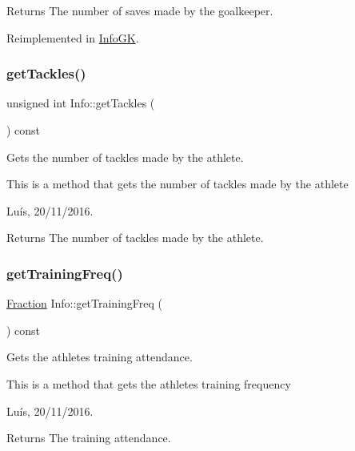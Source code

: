 \begin{DoxyReturn}{Returns}
The number of saves made by the goalkeeper. 
\end{DoxyReturn}


Reimplemented in \hyperlink{class_info_g_k_a5690b8056b8f30b5127f99b46ef9a5d9}{Info\+GK}.

\hypertarget{class_info_abab4dbd4bf56022685e1984fffb00c60}{}\label{class_info_abab4dbd4bf56022685e1984fffb00c60} 
\subsubsection{\texorpdfstring{get\+Tackles()}{getTackles()}}
{\footnotesize\ttfamily unsigned int Info\+::get\+Tackles (\begin{DoxyParamCaption}{ }\end{DoxyParamCaption}) const}



Gets the number of tackles made by the athlete. 

This is a method that gets the number of tackles made by the athlete

Luís, 20/11/2016. 

\begin{DoxyReturn}{Returns}
The number of tackles made by the athlete. 
\end{DoxyReturn}
\hypertarget{class_info_ace20d53ed24c8288e7e2fab3d4c4faa1}{}\label{class_info_ace20d53ed24c8288e7e2fab3d4c4faa1} 
\subsubsection{\texorpdfstring{get\+Training\+Freq()}{getTrainingFreq()}}
{\footnotesize\ttfamily \hyperlink{class_fraction}{Fraction} Info\+::get\+Training\+Freq (\begin{DoxyParamCaption}{ }\end{DoxyParamCaption}) const}



Gets the athlete\textquotesingle{}s training attendance. 

This is a method that gets the athlete\textquotesingle{}s training frequency

Luís, 20/11/2016. 

\begin{DoxyReturn}{Returns}
The training attendance. 
\end{DoxyReturn}
\hypertarget{class_info_ab357ec119b1281b94e37a1a853e1d149}{}\label{class_info_ab357ec119b1281b94e37a1a853e1d149} 
